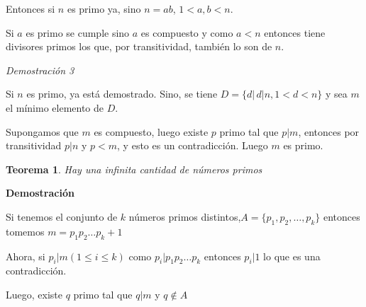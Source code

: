 \documentclass[a4paper,1pt]{report}
\newtheorem*{teo}{Teorema}
\begin{document}
Entonces si $n$ es primo ya, sino $n=ab$, $1<a,b<n$.

Si $a$ es primo se cumple sino $a$ es compuesto y como $a<n$ entonces tiene divisores primos los que, por transitividad, también lo son de $n$.

\textit{Demostración 3}

Si $n$ es primo, ya está demostrado.
Sino, se tiene $D=\{d|\, d|n, 1<d<n\}$ y sea $m$ el mínimo elemento de $D$. 

Supongamos que $m$ es compuesto, luego existe $p$ primo tal que $p|m$, entonces por transitividad $p|n$ y $p<m$, y esto es un contradicción. Luego $m$ es primo.

\begin{teo}
 Hay una infinita cantidad de números primos
\end{teo}

\textbf{Demostración}

Si tenemos el conjunto de $k$ números primos distintos,$A=\{p_1,p_2,\dots ,p_k\}$
entonces tomemos $m=p_1p_2\dots p_k+1$

Ahora, si $p_i|m (1\leq i\leq k)$ como $p_i|p_1p_2\dots p_k$  entonces $p_i|1$ lo que es una contradicción.

Luego, existe $q$ primo tal que $q|m$ y $q\not\in A$
\end{document}
